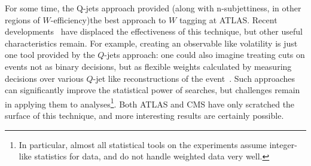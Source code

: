 For some time, the Q-jets approach provided (along with n-subjettiness, in other regions of $W$-efficiency)the best approach to $W$ tagging at ATLAS. Recent developments~\cite{EEC} have displaced the effectiveness of this technique, but other useful characteristics remain. For example, creating an observable like volatility is just one tool provided by the $Q$-jets approach: one could also imagine treating cuts on events not as binary decisions, but as flexible weights calculated by measuring decisions over various $Q$-jet like reconstructions of the event~\cite{Ellis:2012sn}. Such approaches can significantly improve the statistical power of searches, but challenges remain in applying them to analyses\footnote{In particular, almost all statistical tools on the experiments assume integer-like statistics for data, and do not handle weighted data very well.}. Both ATLAS and CMS have only scratched the surface of this technique, and more interesting results are certainly possible.